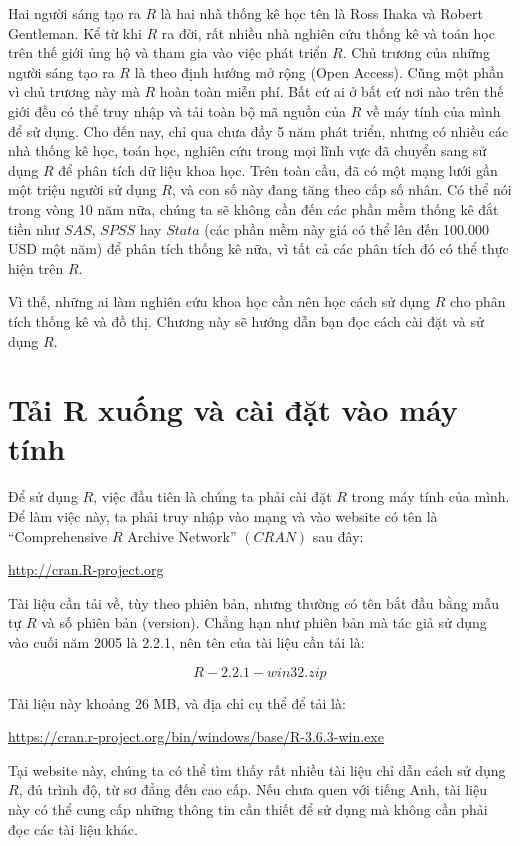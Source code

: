 \documentclass[
]{book}
\begin{document}
Hai người sáng tạo ra \(R\) là hai nhà thống kê học tên là Ross Ihaka và Robert Gentleman. Kể từ khi \(R\) ra đời, rất nhiều nhà nghiên cứu thống kê và toán học trên thế giới ủng hộ và tham gia vào việc phát triển \(R\). Chủ trương của những người sáng tạo ra \(R\) là theo định hướng mở rộng (Open Access). Cũng một phần vì chủ trương này mà \(R\) hoàn toàn miễn phí. Bất cứ ai ở bất cứ nơi nào trên thế giới đều có thể truy nhập và tải toàn bộ mã nguồn của \(R\) về máy tính của mình để sử dụng. Cho đến nay, chỉ qua chưa đầy 5 năm phát triển, nhưng có nhiều các nhà thống kê học, toán học, nghiên cứu trong mọi lĩnh vực đã chuyển sang sử dụng \(R\) để phân tích dữ liệu khoa học. Trên toàn cầu, đã có một mạng lưới gần một triệu người sử dụng \(R\), và con số này đang tăng theo cấp số nhân. Có thể nói trong vòng 10 năm nữa, chúng ta sẽ không cần đến các phần mềm thống kê đắt tiền như \(SAS\), \(SPSS\) hay \(Stata\) (các phần mềm này giá có thể lên đến 100.000 USD một năm) để phân tích thống kê nữa, vì tất cả các phân tích đó có thể thực hiện trên \(R\).

Vì thế, những ai làm nghiên cứu khoa học cần nên học cách sử dụng \(R\) cho phân tích thống kê và đồ thị. Chương này sẽ hướng dẫn bạn đọc cách cài đặt và sử dụng \(R\).

\hypertarget{tux1ea3i-r-xuux1ed1ng-vuxe0-cuxe0i-ux111ux1eb7t-vuxe0o-muxe1y-tuxednh}{%
\section{Tải R xuống và cài đặt vào máy tính}\label{tux1ea3i-r-xuux1ed1ng-vuxe0-cuxe0i-ux111ux1eb7t-vuxe0o-muxe1y-tuxednh}}

Để sử dụng \(R\), việc đầu tiên là chúng ta phải cài đặt \(R\) trong máy tính của mình. Để làm việc này, ta phải truy nhập vào mạng và vào website có tên là ``Comprehensive \(R\) Archive Network'' \((CRAN)\) sau đây:

\url{http://cran.R-project.org}

Tài liệu cần tải về, tùy theo phiên bản, nhưng thường có tên bắt đầu bằng mẫu tự \(R\) và số phiên bản (version). Chẳng hạn như phiên bản mà tác giả sử dụng vào cuối năm 2005 là 2.2.1, nên tên của tài liệu cần tải là:

\[R-2.2.1-win32.zip\]

Tài liệu này khoảng 26 MB, và địa chỉ cụ thể để tải là:

\url{https://cran.r-project.org/bin/windows/base/R-3.6.3-win.exe}

Tại website này, chúng ta có thể tìm thấy rất nhiều tài liệu chỉ dẫn cách sử dụng \(R\), đủ trình độ, từ sơ đẳng đến cao cấp. Nếu chưa quen với tiếng Anh, tài liệu này có thể cung cấp những thông tin cần thiết để sử dụng mà không cần phải đọc các tài liệu khác.
\end{document}
